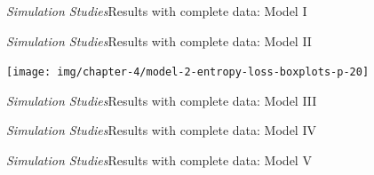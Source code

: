 \begin{frame}[c]{\emph{Simulation Studies}}{Results with complete data: Model I}
\centering
\end{frame}

\begin{frame}[c]{\emph{Simulation Studies}}{Results with complete data: Model II}
\begin{center}
  \texttt{[image: img/chapter-4/model-2-entropy-loss-boxplots-p-20]}
\end{center}
\end{frame}

\begin{frame}[c]{\emph{Simulation Studies}}{Results with complete data: Model III}
\centering
\end{frame}

\begin{frame}[c]{\emph{Simulation Studies}}{Results with complete data: Model IV}
\centering
{}
\end{frame}
\begin{frame}[c]{\emph{Simulation Studies}}{Results with complete data: Model V}
\centering
\end{frame}

